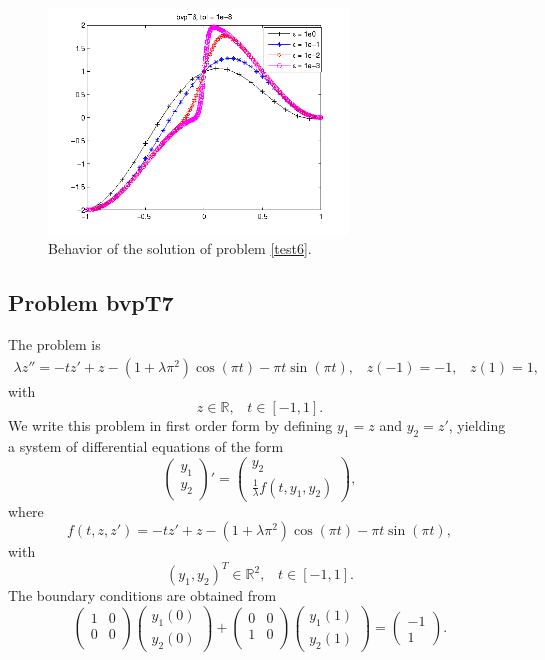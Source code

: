 \documentclass[<options>]{article}
\def \RR {{\mathbb{R}}}
\begin{document}
\begin{figure}[htb]
\centerline{\includegraphics[height=6cm]{Prob6}}
\caption{Behavior of the solution of problem \ref{test6}.}
\end{figure}
\newpage
\subsection{Problem bvpT7}\label{test7}
The problem is 
\begin{eqnarray*}
\lambda z'' = - t z' + z - (1 +\lambda \pi^{2}) \cos(\pi t) - \pi t \sin(\pi t), \;\;\;z(-1) =   -1, \;\;\; z(1) = 1,
\end{eqnarray*}
with
\[
z \in \RR, \;\;\; t\in [-1,1].
\]
We write this problem in first order form by defining $y_1=z$ and $y_2=z'$, yielding a system of differential equations of the form
\begin{equation*}
\left(\begin{array}{c}
y_1\\
y_2
\end{array}\right)'=
\left(\begin{array}{c}
y_2\\
\frac{1}{\lambda}f(t,y_1,y_2)
\end{array}\right),
\end{equation*}
where
\begin{equation*}
  f(t,z,z') = - t z' + z - (1 +\lambda \pi^{2}) \cos(\pi t) - \pi t \sin(\pi t),
\end{equation*}
with
\[
(y_1,y_2)^T \in \RR^{2}, \;\;\;  t \in [-1,1].
\]
The  boundary conditions are obtained from
\begin{equation*}
\left(
  \begin{array}{cc}
    1 & 0 \\
    0 & 0 \\
  \end{array}
\right)
\left(\begin{array}{c}
y_{1}(0)\\
y_{2}(0)
\end{array}\right)
+
\left(
  \begin{array}{cc}
    0 & 0 \\
    1 & 0 \\
  \end{array}
\right)
\left(\begin{array}{c}
y_{1}(1)\\
y_{2}(1)
\end{array}\right)=\left(\begin{array}{c}
-1 \\
1
\end{array}\right).
\end{equation*}
\end{document}
